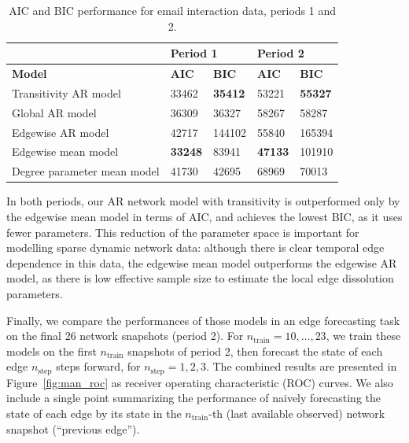 \documentclass[12pt]{article}
\newcommand{\0}{{\bf 0}}
\begin{document}
\begin{table}[]
     \vspace{-0.2cm}
\begin{center}
\resizebox{4in}{!} {
\begin{tabular}{|l|ll|ll|}
\hline
\textbf{}                   & \multicolumn{2}{l|}{\textbf{Period 1}}               & \multicolumn{2}{l|}{\textbf{Period 2}}               \\ \hline
\textbf{Model}              & \multicolumn{1}{l|}{\textbf{AIC}}   & \textbf{BIC}   & \multicolumn{1}{l|}{\textbf{AIC}}   & \textbf{BIC}   \\ \hline
Transitivity AR model       & \multicolumn{1}{l|}{33462} & \textbf{35412} & \multicolumn{1}{l|}{53221}          & \textbf{55327} \\ \hline
Global AR model             & \multicolumn{1}{l|}{36309}          & 36327          & \multicolumn{1}{l|}{58267}          & 58287          \\ \hline
Edgewise AR model           & \multicolumn{1}{l|}{42717}          & 144102         & \multicolumn{1}{l|}{55840}          & 165394         \\ \hline
Edgewise mean model         & \multicolumn{1}{l|}{\textbf{33248}}        & 83941          & \multicolumn{1}{l|}{\textbf{47133}} & 101910         \\ \hline
Degree parameter mean model & \multicolumn{1}{l|}{41730}          & 42695          & \multicolumn{1}{l|}{68969}          & 70013          \\ \hline
\end{tabular}
}
\end{center}
     \vspace{-0.2cm}
\caption{\label{tab:aic_man}{AIC and BIC performance for email interaction data, periods 1 and 2.}}
     \vspace{-0.2cm}
\end{table}

In both periods, our AR network model with transitivity is outperformed only by the edgewise mean model in terms of AIC, and achieves the lowest BIC, as it uses fewer parameters. 
This reduction of the parameter space is important for modelling sparse dynamic network data: although there is clear temporal edge dependence in this data, the edgewise mean model outperforms the edgewise AR model, as there is low effective sample size to estimate the local edge dissolution parameters. 

Finally, we compare the performances of those  models in an edge forecasting task on the final 26 network snapshots (period 2). 
For $n_{\mathrm{train}}=10, \ldots, 23$, we train these models on the first $n_{\mathrm{train}}$ snapshots of period 2, then forecast the state of each edge $n_{\mathrm{step}}$ steps forward, for $n_{\mathrm{step}}=1, 2, 3$. 
The combined results are presented in Figure~\ref{fig:man_roc} as receiver operating characteristic (ROC) curves. We also include a single point summarizing the performance of naively forecasting the state of each edge by its state in the $n_{\mathrm{train}}$-th (last available observed) network snapshot (``previous edge'').
\end{document}
